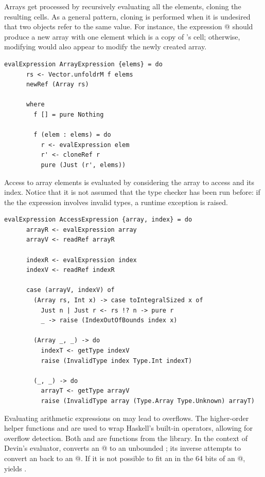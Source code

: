 \documentclass[UdineBachThesis,american,11pt]{PhdThesis}
\begin{document}
  Arrays get processed by recursively evaluating all the elements, cloning the
  resulting cells. As a general pattern, cloning is performed when it is
  undesired that two objects refer to the same value. For instance, the
  expression \lstinline@[x]@ should produce a new array with one element which
  is a copy of \lstinline@x@'s cell; otherwise, modifying \lstinline@x@ would
  also appear to modify the newly created array.

  \begin{lstlisting}[gobble=4,basicstyle=\ttfamily\small]
    evalExpression ArrayExpression {elems} = do
      rs <- Vector.unfoldrM f elems
      newRef (Array rs)

      where
        f [] = pure Nothing

        f (elem : elems) = do
          r <- evalExpression elem
          r' <- cloneRef r
          pure (Just (r', elems))
  \end{lstlisting}

  Access to array elements is evaluated by considering the array to access and
  its index. Notice that it is not assumed that the type checker has been run
  before: if the the expression involves invalid types, a runtime exception is
  raised.

  \begin{lstlisting}[gobble=4,basicstyle=\ttfamily\small]
    evalExpression AccessExpression {array, index} = do
      arrayR <- evalExpression array
      arrayV <- readRef arrayR

      indexR <- evalExpression index
      indexV <- readRef indexR

      case (arrayV, indexV) of
        (Array rs, Int x) -> case toIntegralSized x of
          Just n | Just r <- rs !? n -> pure r
          _ -> raise (IndexOutOfBounds index x)

        (Array _, _) -> do
          indexT <- getType indexV
          raise (InvalidType index Type.Int indexT)

        (_, _) -> do
          arrayT <- getType arrayV
          raise (InvalidType array (Type.Array Type.Unknown) arrayT)
  \end{lstlisting}

  Evaluating arithmetic expressions on \lstinline@Int@s may lead to overflows.
  The higher-order helper functions \lstinline@safeUnary@ and
  \lstinline@safeBinary@ are used to wrap Haskell's built-in operators, allowing
  for overflow detection. Both \lstinline@toInteger@ and
  \lstinline@toIntegralSized@ are functions from the \lstinline@base@ library.
  In the context of Devin's evaluator, \lstinline@toInteger@ converts an
  @ to an unbounded \lstinline@Integer@; its inverse
  \lstinline@toIntegralSized@ attempts to convert an \lstinline@Integer@ back to
  an @. If it is not possible to fit an \lstinline@Integer@ in
  the 64 bits of an @, \lstinline@toIntegralSized@ yields
  \lstinline@Nothing@.
\end{document}

